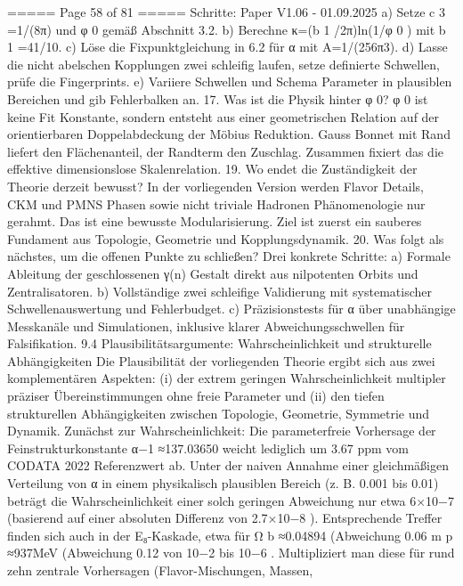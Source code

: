 \begin{MyVerbatim}
{{===== Page 58 of 81 =====
Schritte:
Paper V1.06 - 01.09.2025
a) Setze c 3 =1/(8π) und φ 0 gemäß Abschnitt 3.2.
b) Berechne κ=(b 1 /2π)ln(1/φ 0 ) mit b 1 =41/10.
c) Löse die Fixpunktgleichung in 6.2 für α mit A=1/(256π3).
d) Lasse die nicht abelschen Kopplungen zwei schleifig laufen, setze definierte Schwellen, prüfe die Fingerprints.
e) Variiere Schwellen und Schema Parameter in plausiblen Bereichen und gib Fehlerbalken an.
17. Was ist die Physik hinter φ 0?
φ 0 ist keine Fit Konstante, sondern entsteht aus einer geometrischen Relation auf der orientierbaren Doppelabdeckung
der Möbius Reduktion. Gauss Bonnet mit Rand liefert den Flächenanteil, der Randterm den Zuschlag. Zusammen fixiert
das die effektive dimensionslose Skalenrelation.
19. Wo endet die Zuständigkeit der Theorie derzeit bewusst?
In der vorliegenden Version werden Flavor Details, CKM und PMNS Phasen sowie nicht triviale Hadronen
Phänomenologie nur gerahmt. Das ist eine bewusste Modularisierung. Ziel ist zuerst ein sauberes Fundament aus
Topologie, Geometrie und Kopplungsdynamik.
20. Was folgt als nächstes, um die offenen Punkte zu schließen?
Drei konkrete Schritte:
a) Formale Ableitung der geschlossenen γ(n) Gestalt direkt aus nilpotenten Orbits und Zentralisatoren.
b) Vollständige zwei schleifige Validierung mit systematischer Schwellenauswertung und Fehlerbudget.
c) Präzisionstests für α über unabhängige Messkanäle und Simulationen, inklusive klarer Abweichungsschwellen für
Falsifikation.
9.4 Plausibilitätsargumente: Wahrscheinlichkeit und strukturelle Abhängigkeiten
Die Plausibilität der vorliegenden Theorie ergibt sich aus zwei komplementären Aspekten: (i) der extrem geringen
Wahrscheinlichkeit multipler präziser Übereinstimmungen ohne freie Parameter und (ii) den tiefen strukturellen
Abhängigkeiten zwischen Topologie, Geometrie, Symmetrie und Dynamik.
Zunächst zur Wahrscheinlichkeit: Die parameterfreie Vorhersage der Feinstrukturkonstante α−1 ≈137.03650 weicht
lediglich um 3.67 ppm vom CODATA 2022 Referenzwert ab. Unter der naiven Annahme einer gleichmäßigen Verteilung
von α in einem physikalisch plausiblen Bereich (z. B. 0.001 bis 0.01) beträgt die Wahrscheinlichkeit einer solch geringen
Abweichung nur etwa
6×10−7
(basierend auf einer absoluten Differenz von
2.7×10−8
). Entsprechende Treffer finden
sich auch in der E₈-Kaskade, etwa für Ω b ≈0.04894 (Abweichung 0.06%
m p ≈937MeV (Abweichung 0.12%
von
10−2
bis
10−6
. Multipliziert man diese für rund zehn zentrale Vorhersagen (Flavor-Mischungen, Massen,
}}
\end{MyVerbatim}

